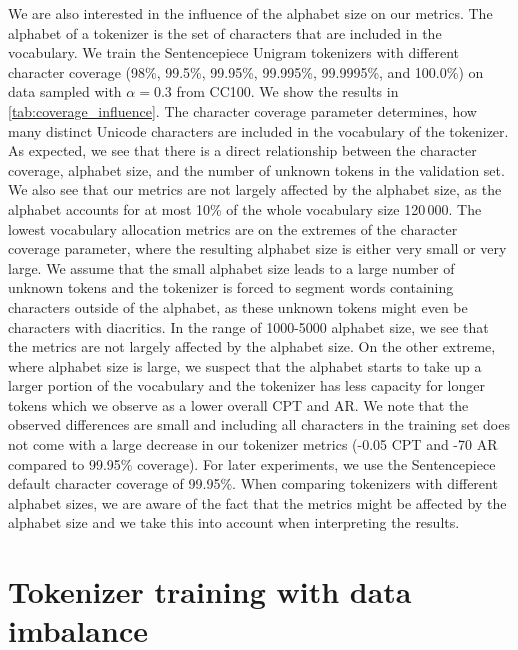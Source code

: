 We are also interested in the influence of the alphabet size on our metrics. The alphabet of a tokenizer is the set of characters that are included in the vocabulary. 
We train the Sentencepiece Unigram tokenizers with different character coverage (98\%, 99.5\%, 99.95\%, 99.995\%, 99.9995\%, and 100.0\%) on data sampled with $\alpha=0.3$ from CC100. We show the results in \autoref{tab:coverage_influence}. The character coverage parameter determines, how many distinct Unicode characters are included in the vocabulary of the tokenizer. As expected, we see that there is a direct relationship between the character coverage, alphabet size, and the number of unknown tokens in the validation set. We also see that our metrics are not largely affected by the alphabet size, as the alphabet accounts for at most 10\% of the whole vocabulary size 120\,000. The lowest vocabulary allocation metrics are on the extremes of the character coverage parameter, where the resulting alphabet size is either very small or very large. We assume that the small alphabet size leads to a large number of unknown tokens and the tokenizer is forced to segment words containing characters outside of the alphabet, as these unknown tokens might even be characters with diacritics. In the range of 1000-5000 alphabet size, we see that the metrics are not largely affected by the alphabet size. On the other extreme, where alphabet size is large, we suspect that the alphabet starts to take up a larger portion of the vocabulary and the tokenizer has less capacity for longer tokens which we observe as a lower overall CPT and AR. We note that the observed differences are small and including all characters in the training set does not come with a large decrease in our tokenizer metrics (-0.05 CPT and -70 AR compared to 99.95\% coverage). For later experiments, we use the Sentencepiece default character coverage of 99.95\%. When comparing tokenizers with different alphabet sizes, we are aware of the fact that the metrics might be affected by the alphabet size and we take this into account when interpreting the results.

\section{Tokenizer training with data imbalance}
\label{sec:tokenizer_training_with_data_imbalance}

